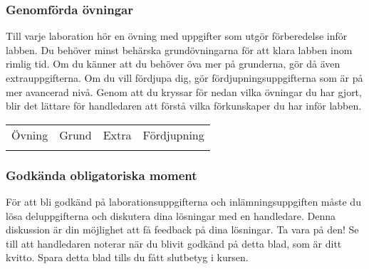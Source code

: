 


\subsubsection*{Genomförda övningar}

\vspace{1em}\noindent 
{Till varje laboration hör en övning med uppgifter som utgör förberedelse inför labben. Du behöver minst behärska grundövningarna för att klara labben inom rimlig tid. Om du känner att du behöver öva mer på grunderna, gör då även extrauppgifterna. Om du vill fördjupa dig, gör fördjupningsuppgifterna som är på mer avancerad nivå. Genom att du kryssar för nedan vilka övningar du har gjort, blir det lättare för handledaren att förstå vilka förkunskaper du har inför labben.}

\newcommand{\TickBox}{\raisebox{-.50ex}{\Large$\square$}}
\newcommand{\ExeRow}[1]{\texttt{#1} & \TickBox  &  \TickBox &  \TickBox  \\ \addlinespace }

\begin{table}[h]
\centering
\vspace{2em}
\begin{tabular}{lccc}
\toprule \addlinespace 
{\sffamily\small Övning} & 
{\sffamily\small Grund} &	
{\sffamily\small Extra} &
{\sffamily\small Fördjupning}\\ \addlinespace \midrule \\[-0.7em]

\bottomrule
\end{tabular}
\end{table}

\newpage

\subsubsection*{Godkända obligatoriska moment}

\vspace{1em}\noindent 
För att bli godkänd på laborationsuppgifterna och inlämningsuppgiften måste du lösa deluppgifterna och diskutera dina lösningar med en handledare. Denna diskussion är din möjlighet att få feedback på dina lösningar. Ta vara på den!
Se till att handledaren noterar när du blivit godkänd på detta blad, som är ditt kvitto. Spara detta blad tills du fått slutbetyg i kursen. 


